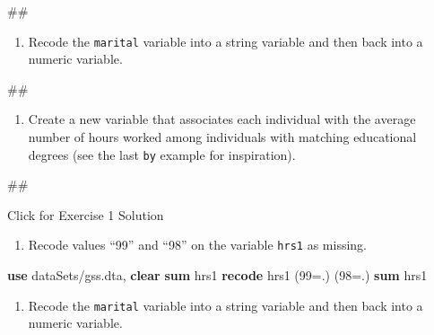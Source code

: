 \documentclass[
]{book}
\newenvironment{Shaded}{\begin{snugshade}}{\end{snugshade}}
\newcommand{\KeywordTok}[1]{\textcolor[rgb]{0.13,0.29,0.53}{\textbf{#1}}}
\newcommand{\NormalTok}[1]{#1}
\providecommand{\tightlist}{%
  \setlength{\itemsep}{0pt}\setlength{\parskip}{0pt}}
\begin{document}
\begin{Shaded}
\begin{Highlighting}[]
\NormalTok{\#\#}
\end{Highlighting}
\end{Shaded}

\begin{enumerate}
\def\labelenumi{\arabic{enumi}.}
\setcounter{enumi}{1}
\tightlist
\item
  Recode the \texttt{marital} variable into a string variable and then back into a numeric variable.
\end{enumerate}

\begin{Shaded}
\begin{Highlighting}[]
\NormalTok{\#\#}
\end{Highlighting}
\end{Shaded}

\begin{enumerate}
\def\labelenumi{\arabic{enumi}.}
\setcounter{enumi}{2}
\tightlist
\item
  Create a new variable that associates each individual with the average number of hours worked among individuals with matching educational degrees (see the last \texttt{by} example for inspiration).
\end{enumerate}

\begin{Shaded}
\begin{Highlighting}[]
\NormalTok{\#\#}
\end{Highlighting}
\end{Shaded}

{Click for Exercise 1 Solution}

\begin{enumerate}
\def\labelenumi{\arabic{enumi}.}
\tightlist
\item
  Recode values ``99'' and ``98'' on the variable \texttt{hrs1} as missing.
\end{enumerate}

\begin{Shaded}
\begin{Highlighting}[]
\KeywordTok{use}\NormalTok{ dataSets/gss.dta, }\KeywordTok{clear}
\KeywordTok{sum}\NormalTok{ hrs1}
\KeywordTok{recode}\NormalTok{ hrs1 (99=.) (98=.) }
\KeywordTok{sum}\NormalTok{ hrs1}
\end{Highlighting}
\end{Shaded}

\begin{enumerate}
\def\labelenumi{\arabic{enumi}.}
\setcounter{enumi}{1}
\tightlist
\item
  Recode the \texttt{marital} variable into a string variable and then back into a numeric variable.
\end{enumerate}
\end{document}
